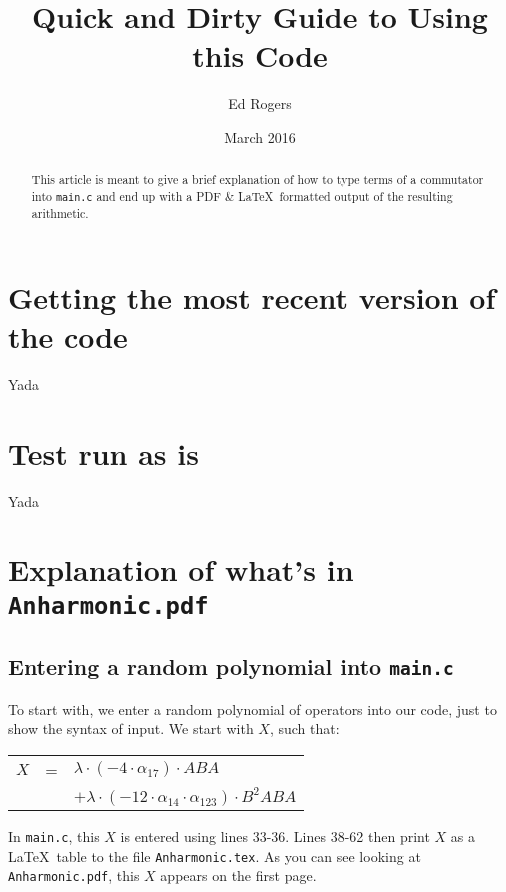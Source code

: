 \documentclass{article}
\title{Quick and Dirty Guide to Using this Code}
\author{Ed Rogers}
\date{March 2016}
\begin{document}
   \maketitle

\begin{abstract}
This article is meant to give a brief explanation of how to type terms of a commutator into \texttt{main.c} and end up with a PDF \& \LaTeX\ formatted output of the resulting arithmetic.
\end{abstract}

\section{Getting the most recent version of the code}
Yada

\section{Test run as is}
Yada

\section{Explanation of what's in \texttt{Anharmonic.pdf}}

\subsection{Entering a random polynomial into \texttt{main.c}}

To start with, we enter a random polynomial of operators into our code, just to show the syntax of input. We start with $X$, such that:

\begin{table}[!hp]
\begin{center}
\begin{tabular}{rcl}
$X$ & = & ${\lambda}{\cdot}(-4{\cdot}{\alpha}_{17}){\cdot}ABA$ \\
 & & $ + {\lambda}{\cdot}(-12{\cdot}{\alpha}_{14}{\cdot}{\alpha}_{123}){\cdot}B^{2}ABA$ \\
\end{tabular}
\end{center}
\end{table}

In \texttt{main.c}, this $X$ is entered using lines 33-36. Lines 38-62 then print $X$ as a \LaTeX\ table to the file \texttt{Anharmonic.tex}. As you can see looking at \texttt{Anharmonic.pdf}, this $X$ appears on the first page.
\end{document}
